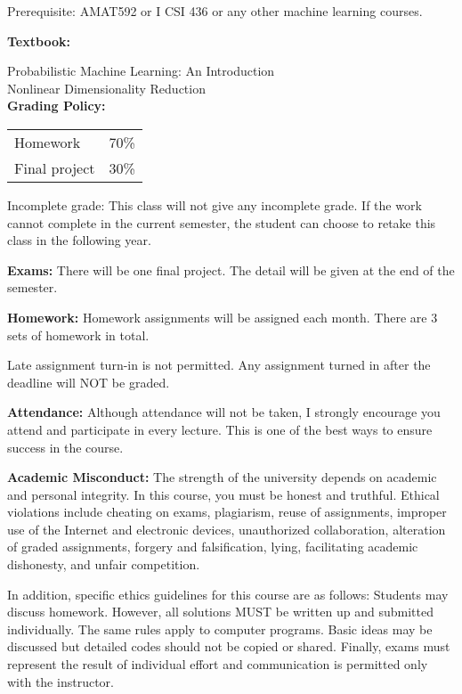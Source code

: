 \documentclass[a4paper,10pt]{article}
\begin{document}
 Prerequisite: AMAT592 or I CSI 436 or any other machine learning courses. 
 

\textbf{Textbook:} 

Probabilistic Machine Learning: An Introduction \\
Nonlinear Dimensionality Reduction \\




\textbf{Grading Policy:}

\begin{tabular}{lr}
Homework & 70\%\\ 
Final project & 30\% \\
\end{tabular}

Incomplete grade: This class will not give any
incomplete grade. If the work cannot complete in the
current semester, the student can choose to retake this
class in the following year.




\textbf{Exams:} There will be one final project. The detail will be given at the end of the semester. 


\textbf{Homework:} Homework assignments will be assigned each month. There are 3 sets of homework in total. 

Late assignment turn-in is not permitted. Any assignment turned in after the deadline will NOT be graded.




\textbf{Attendance:} Although attendance will not be taken, I strongly encourage you attend and participate in every lecture. This is one of the best ways to ensure success in the course.






\textbf{Academic Misconduct:} The strength of the university depends on academic and personal integrity. In this course, you must be honest 
and truthful. Ethical violations include cheating on exams, plagiarism, reuse of assignments, improper use 
of the Internet and electronic devices, unauthorized collaboration, alteration of graded assignments, forgery 
and falsification, lying, facilitating academic dishonesty, and unfair competition.

In addition, specific ethics guidelines for this course are as follows: Students may discuss homework. However, 
all solutions MUST be written up and submitted individually. The same rules apply to computer programs. 
Basic ideas may be discussed but detailed codes should not be copied or shared. Finally, exams must 
represent the result of individual effort and communication is permitted only with the instructor.
\end{document}
